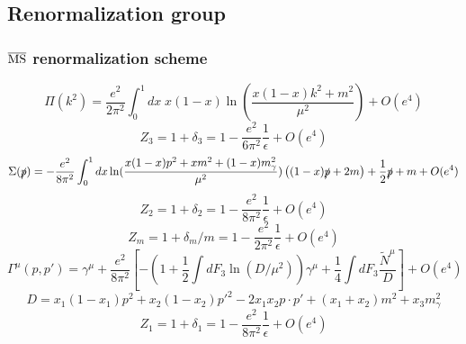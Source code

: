 \subsection{Renormalization group}
\subsubsection{$\overline{\rm MS}$ renormalization scheme}
\[\Pi(k^2) = \frac{e^2}{2\pi^2} \int_0^1 dx \; x(1-x) \ln(\frac{x(1-x)k^2+m^2}{\mu^2}) + O(e^4)\]
\[Z_3 = 1 + \delta_3 = 1-\frac{e^2}{6\pi^2} \frac{1}{\epsilon} + O(e^4)\]
\[\Sigma(\slashed{p}) = -\frac{e^2}{8\pi^2} \int_0^1 dx  \ln(\frac{x(1-x)p^2 + xm^2 + (1-x)m_{\gamma}^2}{\mu^2}) \left((1-x)\slashed{p}+2m\right) + \frac{1}{2}\slashed{p} + m + O(e^4) \]
\[Z_2 = 1 + \delta_2 =  1 - \frac{e^2}{8\pi^2}  \frac{1}{\epsilon} + O(e^4)\]
\[Z_m = 1 + \delta_m/m = 1 - \frac{e^2}{2\pi^2} \frac{1}{\epsilon} + O(e^4) \]
\[\Gamma^{\mu}(p,p') = \gamma^{\mu} + \frac{e^2}{8\pi^2} \left[-\left(  1 + \frac{1}{2} \int dF_3 \ln (D/\mu^2)\right)\gamma^{\mu} + \frac{1}{4} \int dF_3 \frac{\tilde{N}^{\mu}}{D}\right] + O(e^4)\]
\[D = x_1(1-x_1)p^2 + x_2(1-x_2)p'^2 - 2x_1x_2p \cdot p' + (x_1+x_2)m^2 + x_3 m_{\gamma}^2\]
\[Z_1 =1 + \delta_1 = 1 -  \frac{e^2}{8\pi^2}\frac{1}{\epsilon} + O(e^4)\]
